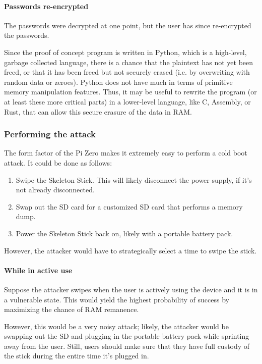 \documentclass{article}
\begin{document}
\paragraph{Passwords re-encrypted} The passwords were decrypted at one point, but the user has since re-encrypted the passwords.

Since the proof of concept program is written in Python, which is a high-level, garbage collected language, there is a chance that the plaintext has not yet been freed, or that it has been freed but not securely erased (i.e. by overwriting with random data or zeroes). Python does not have much in terms of primitive memory manipulation features. Thus, it may be useful to rewrite the program (or at least these more critical parts) in a lower-level language, like C, Assembly, or Rust, that can allow this secure erasure of the data in RAM.

\subsubsection{Performing the attack}

The form factor of the Pi Zero makes it extremely easy to perform a cold boot attack. It could be done as follows:

\begin{enumerate}
    \item Swipe the Skeleton Stick. This will likely disconnect the power supply, if it's not already disconnected.
    \item Swap out the SD card for a customized SD card that performs a memory dump.
    \item Power the Skeleton Stick back on, likely with a portable battery pack.
\end{enumerate}

However, the attacker would have to strategically select a time to swipe the stick.

\paragraph{While in active use} Suppose the attacker swipes when the user is actively using the device and it is in a vulnerable state. This would yield the highest probability of success by maximizing the chance of RAM remanence.

However, this would be a very noisy attack; likely, the attacker would be swapping out the SD and plugging in the portable battery pack while sprinting away from the user. Still, users should make sure that they have full custody of the stick during the entire time it's plugged in.
\end{document}
